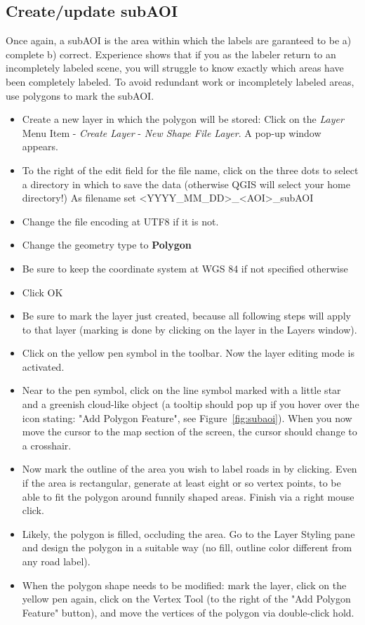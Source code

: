 \documentclass[12pt,a4paper]{scrartcl}
\begin{document}
\subsection{Create/update subAOI}
Once again, a subAOI is the area within which the labels are garanteed to be a) complete b) correct. Experience shows that if you as the labeler return to an incompletely labeled scene, you will struggle to know exactly which areas have been completely labeled. To avoid redundant work or incompletely labeled areas, use polygons to mark the subAOI.

\begin{itemize}
	\item Create a new layer in which the polygon will be stored: Click on the \textit{Layer} Menu Item - \textit{Create Layer} - \textit{New Shape File Layer}. A pop-up window appears.
	\item To the right of the edit field for the file name, click on the three dots to select a directory in which to save the data (otherwise QGIS will select your home directory!) As filename set <YYYY\_MM\_DD>\_<AOI>\_subAOI
	\item Change the file encoding at UTF8 if it is not.
	\item Change the geometry type to \textbf{Polygon}
	\item Be sure to keep the coordinate system at WGS 84 if not specified otherwise
	\item Click OK
	\item Be sure to mark the layer just created, because all following steps will apply to that layer (marking is done by clicking on the layer in the Layers window). 
	\item Click on the yellow pen symbol in the toolbar. Now the layer editing mode is activated.
	\item Near to the pen symbol, click on the line symbol marked with a little star and a greenish cloud-like object (a tooltip should pop up if you hover over the icon stating: "Add Polygon Feature", see Figure~\ref{fig:subaoi}). When you now move the cursor to the map section of the screen, the cursor should change to a crosshair.
	\item Now mark the outline of the area you wish to label roads in by clicking. Even if the area is rectangular, generate at least eight or so vertex points, to be able to fit the polygon around funnily shaped areas. Finish via a right mouse click.
	\item Likely, the polygon is filled, occluding the area. Go to the Layer Styling pane and design the polygon in a suitable way (no fill, outline color different from any road label).
	\item When the polygon shape needs to be modified: mark the layer, click on the yellow pen again, click on the Vertex Tool (to the right of the "Add Polygon Feature" button), and move the vertices of the polygon via double-click hold.
\end{itemize}
\end{document}
